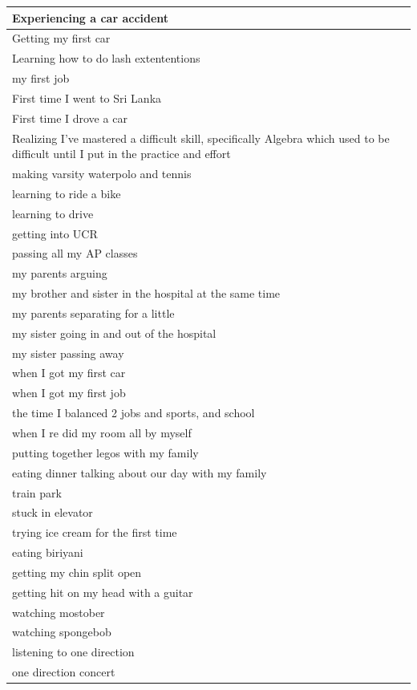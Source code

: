 \documentclass[
  .7em,
  letterpaper,
  DIV=11,
  numbers=noendperiod]{scrartcl}
\begin{document}
\begin{table}
\begin{tabular}{l}
\hline
Experiencing a car accident\\
\hline
Getting my first car\\
\hline
Learning how to do lash extententions\\
\hline
my first job\\
\hline
First time I went to Sri Lanka\\
\hline
First time I drove a car\\
\hline
Realizing I've mastered a difficult skill, specifically Algebra which used to be difficult until I put in the practice and effort\\
\hline
making varsity waterpolo and tennis\\
\hline
learning to ride a bike\\
\hline
learning to drive\\
\hline
getting into UCR\\
\hline
passing all my AP classes\\
\hline
my parents arguing\\
\hline
my brother and sister in the hospital at the same time\\
\hline
my parents separating for a little\\
\hline
my sister going in and out of the hospital\\
\hline
my sister passing away\\
\hline
when I got my first car\\
\hline
when I got my first job\\
\hline
the time I balanced 2 jobs and sports, and school\\
\hline
when I re did my room all by myself\\
\hline
putting together legos with my family\\
\hline
eating dinner talking about our day with my family\\
\hline
train park\\
\hline
stuck in elevator\\
\hline
trying ice cream for the first time\\
\hline
eating biriyani\\
\hline
getting my chin split open\\
\hline
getting hit on my head with a guitar\\
\hline
watching mostober\\
\hline
watching spongebob\\
\hline
listening to one direction\\
\hline
one direction concert\\

\end{tabular}
\end{table}
\end{document}

